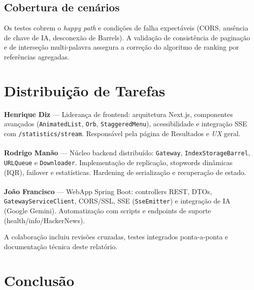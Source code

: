 \documentclass[12pt,a4paper]{article}
\begin{document}
\subsection{Cobertura de cenários}
Os testes cobrem o \textit{happy path} e condições de falha expectáveis (CORS, ausência de chave de IA, desconexão de Barrels). A validação de consistência de paginação e de interseção multi-palavra assegura a correção do algoritmo de ranking por referências agregadas.

\newpage

\section{Distribuição de Tarefas}

\textbf{Henrique Diz} — Liderança de frontend: arquitetura Next.js, componentes avançados (\texttt{AnimatedList}, \texttt{Orb}, \texttt{StaggeredMenu}), acessibilidade e integração SSE com \texttt{/statistics/stream}. Responsável pela página de Resultados e \textit{UX} geral.
\paragraph{}

\textbf{Rodrigo Manão} — Núcleo backend distribuído: \texttt{Gateway}, \texttt{IndexStorageBarrel}, \texttt{URLQueue} e \texttt{Downloader}. Implementação de replicação, stopwords dinâmicas (IQR), failover e estatísticas. Hardening de serialização e recuperação de estado.
\paragraph{}

\textbf{João Francisco} — WebApp Spring Boot: controllers REST, DTOs, \texttt{GatewayServiceClient}, CORS/SSL, SSE (\texttt{SseEmitter}) e integração de IA (Google Gemini). Automatização com scripts e endpoints de suporte (health/info/HackerNews).

\vspace{0.2cm}
A colaboração incluiu revisões cruzadas, testes integrados ponta-a-ponta e documentação técnica deste relatório.

\newpage

\section{Conclusão}
\end{document}
